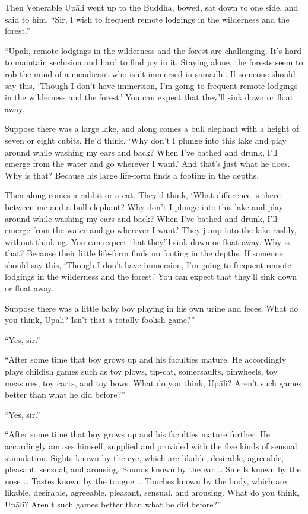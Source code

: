 \documentclass[12pt,openany]{book}%
\begin{document}
Then Venerable \textsanskrit{Upāli} went up to the Buddha, bowed, sat down to one side, and said to him, “Sir, I wish to frequent remote lodgings in the wilderness and the forest.” 

“\textsanskrit{Upāli}, remote lodgings in the wilderness and the forest are challenging. It’s hard to maintain seclusion and hard to find joy in it. Staying alone, the forests seem to rob the mind of a mendicant who isn’t immersed in \textsanskrit{samādhi}. If someone should say this, ‘Though I don’t have immersion, I’m going to frequent remote lodgings in the wilderness and the forest.’ You can expect that they’ll sink down or float away. 

Suppose there was a large lake, and along comes a bull elephant with a height of seven or eight cubits. He’d think, ‘Why don’t I plunge into this lake and play around while washing my ears and back? When I’ve bathed and drunk, I’ll emerge from the water and go wherever I want.’ And that’s just what he does. Why is that? Because his large life-form finds a footing in the depths. 

Then along comes a rabbit or a cat. They’d think, ‘What difference is there between me and a bull elephant? Why don’t I plunge into this lake and play around while washing my ears and back? When I’ve bathed and drunk, I’ll emerge from the water and go wherever I want.’ They jump into the lake rashly, without thinking. You can expect that they’ll sink down or float away. Why is that? Because their little life-form finds no footing in the depths. If someone should say this, ‘Though I don’t have immersion, I’m going to frequent remote lodgings in the wilderness and the forest.’ You can expect that they’ll sink down or float away. 

Suppose there was a little baby boy playing in his own urine and feces. What do you think, \textsanskrit{Upāli}? Isn’t that a totally foolish game?” 

“Yes, sir.” 

“After some time that boy grows up and his faculties mature. He accordingly plays childish games such as toy plows, tip-cat, somersaults, pinwheels, toy measures, toy carts, and toy bows. What do you think, \textsanskrit{Upāli}? Aren’t such games better than what he did before?” 

“Yes, sir.” 

“After some time that boy grows up and his faculties mature further. He accordingly amuses himself, supplied and provided with the five kinds of sensual stimulation. Sights known by the eye, which are likable, desirable, agreeable, pleasant, sensual, and arousing. Sounds known by the ear … Smells known by the nose … Tastes known by the tongue … Touches known by the body, which are likable, desirable, agreeable, pleasant, sensual, and arousing. What do you think, \textsanskrit{Upāli}? Aren’t such games better than what he did before?” 
\end{document}
